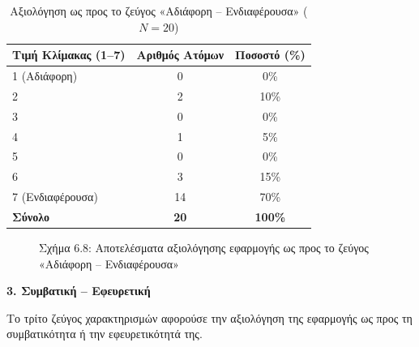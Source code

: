 \documentclass[twoside, a4paper, 11pt]{article}
\begin{document}
\begin{table}[H]
    \centering
    \caption{Αξιολόγηση ως προς το ζεύγος «Αδιάφορη – Ενδιαφέρουσα» ($N = 20$)}
    \begin{tabular}{|l|c|c|}
        \hline
        \textbf{Τιμή Κλίμακας (1–7)} & \textbf{Αριθμός Ατόμων} & \textbf{Ποσοστό (\%)} \\ \hline
        1 (Αδιάφορη) & 0 & 0\% \\ \hline
        2 & 2 & 10\% \\ \hline
        3 & 0 & 0\% \\ \hline
        4 & 1 & 5\% \\ \hline
        5 & 0 & 0\% \\ \hline
        6 & 3 & 15\% \\ \hline
        7 (Ενδιαφέρουσα) & 14 & 70\% \\ \hline
        \textbf{Σύνολο} & \textbf{20} & \textbf{100\%} \\ \hline
    \end{tabular}
\end{table}

\begin{figure}[H]
    \centering
    \caption{Σχήμα 6.8: Αποτελέσματα αξιολόγησης εφαρμογής ως προς το ζεύγος «Αδιάφορη – Ενδιαφέρουσα»}
\end{figure}

\vspace{1em}
\noindent\textbf{3. Συμβατική – Εφευρετική}

Το τρίτο ζεύγος χαρακτηρισμών αφορούσε την αξιολόγηση της εφαρμογής ως προς τη συμβατικότητα ή την εφευρετικότητά της.
\end{document}
